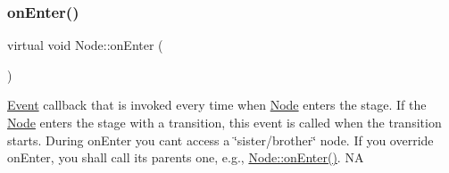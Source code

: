 \mbox{\label{classNode_adde49eb69aebd860d7b95bf484cd96f3}} 
\subsubsection{\texorpdfstring{on\+Enter()}{onEnter()}\hspace{0.1cm}{\footnotesize\ttfamily [2/2]}}
{\footnotesize\ttfamily virtual void Node\+::on\+Enter (\begin{DoxyParamCaption}{ }\end{DoxyParamCaption})\hspace{0.3cm}{\ttfamily [virtual]}}

\hyperlink{classEvent}{Event} callback that is invoked every time when \hyperlink{classNode}{Node} enters the \textquotesingle{}stage\textquotesingle{}. If the \hyperlink{classNode}{Node} enters the \textquotesingle{}stage\textquotesingle{} with a transition, this event is called when the transition starts. During on\+Enter you can\textquotesingle{}t access a \char`\"{}sister/brother\char`\"{} node. If you override on\+Enter, you shall call its parent\textquotesingle{}s one, e.\+g., \hyperlink{classNode_a7f51764c4afd5018a052b9ef71c03374}{Node\+::on\+Enter()}.  NA 


